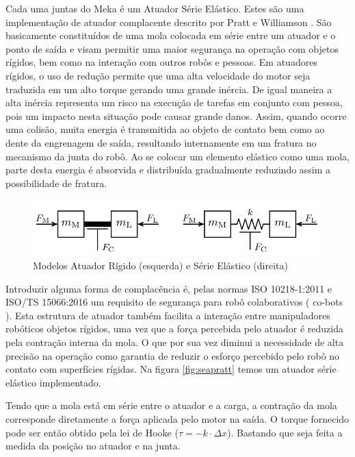 Cada uma juntas do Meka é um Atuador Série Elástico. Estes são uma implementação de atuador complacente descrito por Pratt e Williamson \cite{pratt1995series}. São basicamente constituídos de uma mola colocada em série entre um atuador e o ponto de saída e visam permitir uma maior segurança na operação com objetos rígidos, bem como na interação com outros robôs e pessoas. Em atuadores rígidos, o uso de redução permite que uma alta velocidade do motor seja traduzida em um alto torque gerando uma grande inércia. De igual maneira a alta inércia representa um risco na execução de tarefas em conjunto com pessoa, pois um impacto nesta situação pode causar grande danos. Assim, quando ocorre uma colisão, muita energia é transmitida ao objeto de contato bem como ao dente da engrenagem de saída, resultando internamente em um fratura no mecanismo da junta do robô. Ao se colocar um elemento elástico como uma mola, parte desta energia é absorvida e distribuída gradualmente reduzindo assim a possibilidade de fratura.

\begin{figure}[H]
    \centering
    \includegraphics[width=0.8\linewidth]{tex/figs/sea_ulrich.png}
    \caption{Modelos Atuador Rígido (esquerda) e Série Elástico (direita) \cite{Konigorski2012ModelSea}}
    \label{fig:sea}
\end{figure}

Introduzir alguma forma de complacência é, pelas normas ISO 10218-1:2011 e ISO/TS 15066:2016 um requisito de segurança para robô colaborativos ( co-bots ). Esta estrutura de atuador também facilita a interação entre manipuladores robóticos objetos rígidos, uma vez que a força percebida pelo atuador é reduzida pela contração interna da mola. O que por sua vez diminui a necessidade de alta precisão na operação como garantia de reduzir o esforço percebido pelo robô no contato com superfícies rígidas. Na figura \ref{fig:seapratt} temos um atuador série elástico implementado.

Tendo que a mola está em série entre o atuador e a carga, a contração da mola corresponde diretamente a força aplicada pelo motor na saída. O torque fornecido pode ser então obtido pela lei de Hooke ($\tau = -k\cdot \Delta x$). Bastando que seja feita a medida da posição no atuador e na junta.

